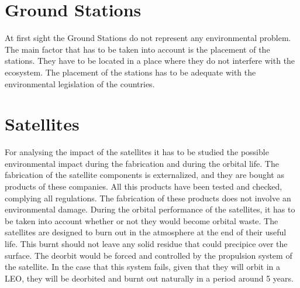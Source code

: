 \section{Ground Stations}
At first sight the Ground Stations do not represent any environmental problem. The main factor that has to be taken into account is the placement of the stations. They have to be located in a place where they do not interfere with the ecosystem. The placement of the stations has to be adequate with the environmental legislation of the countries. 
\section{Satellites}
For analysing the impact of the satellites it has to be studied the possible environmental impact during the fabrication and during the orbital life.
The fabrication of the satellite components is externalized, and they are bought as products of these companies. All this products have been tested and checked, complying all regulations. The fabrication of these products does not involve an environmental damage. 
During the orbital performance of the satellites, it has to be taken into account whether or not they would become orbital waste. The satellites are designed to burn out in the atmosphere at the end of their useful life. This burnt should not leave any solid residue that could precipice over the surface. The deorbit would be forced and controlled by the propulsion system of the satellite. In the case that this system fails, given that they will orbit in a LEO, they will be deorbited and burnt out naturally in a period around 5 years.
